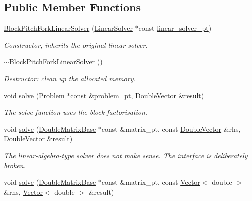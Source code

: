 \subsection*{Public Member Functions}
\begin{DoxyCompactItemize}
\item 
\hyperlink{classoomph_1_1BlockPitchForkLinearSolver_a9820033e85fed1a01a48ac09f27e574f}{Block\+Pitch\+Fork\+Linear\+Solver} (\hyperlink{classoomph_1_1LinearSolver}{Linear\+Solver} $\ast$const \hyperlink{classoomph_1_1BlockPitchForkLinearSolver_a38efead8e84202a3232b4a3624a2986c}{linear\+\_\+solver\+\_\+pt})
\begin{DoxyCompactList}\small\item\em Constructor, inherits the original linear solver. \end{DoxyCompactList}\item 
\hyperlink{classoomph_1_1BlockPitchForkLinearSolver_a3fa97815fefc83c678341222847797ea}{$\sim$\+Block\+Pitch\+Fork\+Linear\+Solver} ()
\begin{DoxyCompactList}\small\item\em Destructor\+: clean up the allocated memory. \end{DoxyCompactList}\item 
void \hyperlink{classoomph_1_1BlockPitchForkLinearSolver_ad196867613954a8fabd318b50e2aadc6}{solve} (\hyperlink{classoomph_1_1Problem}{Problem} $\ast$const \&problem\+\_\+pt, \hyperlink{classoomph_1_1DoubleVector}{Double\+Vector} \&result)
\begin{DoxyCompactList}\small\item\em The solve function uses the block factorisation. \end{DoxyCompactList}\item 
void \hyperlink{classoomph_1_1BlockPitchForkLinearSolver_aaa6dbd59c0f6db8e5a19689888b17eac}{solve} (\hyperlink{classoomph_1_1DoubleMatrixBase}{Double\+Matrix\+Base} $\ast$const \&matrix\+\_\+pt, const \hyperlink{classoomph_1_1DoubleVector}{Double\+Vector} \&rhs, \hyperlink{classoomph_1_1DoubleVector}{Double\+Vector} \&result)
\begin{DoxyCompactList}\small\item\em The linear-\/algebra-\/type solver does not make sense. The interface is deliberately broken. \end{DoxyCompactList}\item 
void \hyperlink{classoomph_1_1BlockPitchForkLinearSolver_a45c8a56bd1942374756feb9edcfb6151}{solve} (\hyperlink{classoomph_1_1DoubleMatrixBase}{Double\+Matrix\+Base} $\ast$const \&matrix\+\_\+pt, const \hyperlink{classoomph_1_1Vector}{Vector}$<$ double $>$ \&rhs, \hyperlink{classoomph_1_1Vector}{Vector}$<$ double $>$ \&result)

\end{DoxyCompactItemize}
